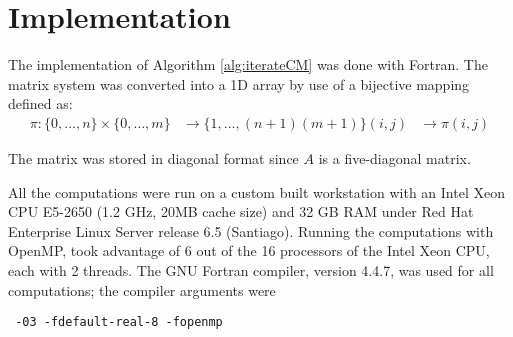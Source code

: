 \section{Implementation}

The implementation of Algorithm \ref{alg:iterateCM} was done with Fortran. The matrix system was converted into a 1D array by use of a bijective mapping defined as:
\begin{equation}
\begin{aligned}
  \pi : \{ 0, \ldots, n\} \times \{0, \ldots, m\} &\to \{1, \ldots, (n+1)(m+1) \}
  (i,j) & \to \pi(i,j)
\end{aligned}
\end{equation}


The matrix was stored in diagonal format since $A$ is a five-diagonal matrix.

All the computations were run on a custom built workstation with an Intel Xeon CPU E5-2650 (1.2 GHz, 20MB cache size) and 32 GB RAM under Red Hat Enterprise Linux Server release 6.5 (Santiago). 
Running the computations with OpenMP, took advantage of 6 out of the 16 processors of the Intel Xeon CPU, each with 2 threads.
The GNU Fortran compiler, version 4.4.7, was used for all computations; the compiler arguments were
\begin{verbatim} -03 -fdefault-real-8 -fopenmp \end{verbatim}

